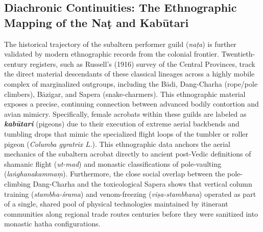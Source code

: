 \documentclass[11pt,letterpaper]{article}
\begin{document}
\subsection{Diachronic Continuities: The Ethnographic Mapping of the Naṭ and Kabūtari}
The historical trajectory of the subaltern performer guild (\textit{naṭa}) is further validated by modern ethnographic records from the colonial frontier. Twentieth-century registers, such as Russell’s (1916) survey of the Central Provinces, track the direct material descendants of these classical lineages across a highly mobile complex of marginalized outgroups, including the Bādi, Dang-Charha (rope/pole climbers), Bāzigar, and Sapera (snake-charmers). This ethnographic material exposes a precise, continuing connection between advanced bodily contortion and avian mimicry. Specifically, female acrobats within these guilds are labeled as \textbf{\textit{kabūtari}} (pigeons) due to their execution of extreme aerial backbends and tumbling drops that mimic the specialized flight loops of the tumbler or roller pigeon (\textit{Columba gyratrix L.}). This ethnographic data anchors the aerial mechanics of the subaltern acrobat directly to ancient post-Vedic definitions of shamanic flight (\textit{ut-mad}) and monastic classifications of pole-vaulting (\textit{laṅghanakammaṃ}). Furthermore, the close social overlap between the pole-climbing Dang-Charha and the toxicological Sapera shows that vertical column training (\textit{stambha-śrama}) and venom-freezing (\textit{viṣa-stambhana}) operated as part of a single, shared pool of physical technologies maintained by itinerant communities along regional trade routes centuries before they were sanitized into monastic hatha configurations.
\end{document}

